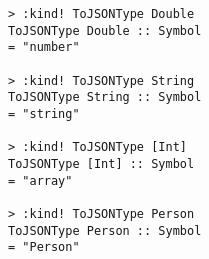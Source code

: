 \begin{repl}\begin{lstlisting}
> :kind! ToJSONType Double
ToJSONType Double :: Symbol
= "number"

> :kind! ToJSONType String
ToJSONType String :: Symbol
= "string"

> :kind! ToJSONType [Int]
ToJSONType [Int] :: Symbol
= "array"

> :kind! ToJSONType Person
ToJSONType Person :: Symbol
= "Person"\end{lstlisting}\end{repl}
